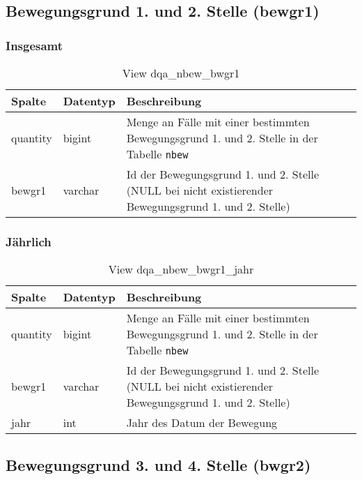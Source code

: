 \subsection{Bewegungsgrund 1. und 2. Stelle (bewgr1)} \label{subsec:bewgr1}

\subsubsection{Insgesamt} \label{subsubsec:bewg1I}

\begin{table}[ht]
	\centering   
	\caption{View dqa\_nbew\_bwgr1}
	\label{tab:bewG1I}
	\begin{tabular}{||l|l|p{10cm}||}   		
		\hline
		Spalte & Datentyp & Beschreibung \\ [0.5ex]
		\hline\hline
		quantity & bigint & Menge an Fälle mit einer bestimmten Bewegungsgrund 1. und 2. Stelle in der Tabelle \texttt{nbew} \\
		\hline
		bewgr1 & varchar & Id der Bewegungsgrund 1. und 2. Stelle (NULL bei nicht existierender Bewegungsgrund 1. und 2. Stelle)\\
		\hline
		
	\end{tabular}
\end{table}


\subsubsection{Jährlich} \label{subsubsec:bewg1J}

\begin{table}[ht]
	\centering   
	\caption{View dqa\_nbew\_bwgr1\_jahr}
	\label{tab:bewG1J}
	\begin{tabular}{||l|l|p{10cm}||}   		
		\hline
		Spalte & Datentyp & Beschreibung \\ [0.5ex]
		\hline\hline
		quantity & bigint & Menge an Fälle mit einer bestimmten Bewegungsgrund 1. und 2. Stelle in der Tabelle \texttt{nbew}\\
		\hline
		bewgr1 & varchar & Id der Bewegungsgrund 1. und 2. Stelle (NULL bei nicht existierender Bewegungsgrund 1. und 2. Stelle)\\
		\hline
		jahr & int &  Jahr des Datum der Bewegung \\
		\hline		
	\end{tabular}
\end{table}

\subsection{Bewegungsgrund 3. und 4. Stelle (bwgr2)} \label{subsec:bewgr2}

